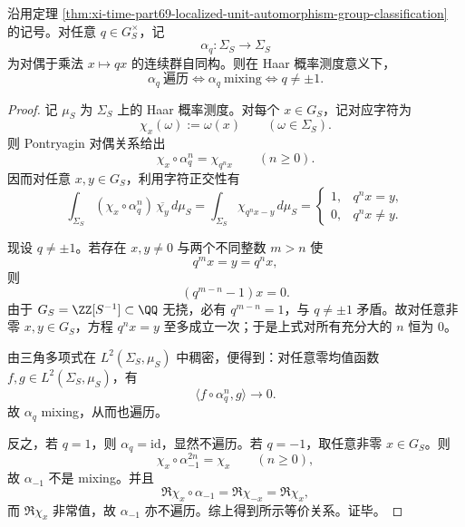 \begin{theorem}[rank-\texorpdfstring{$1$}{1} 局部化世界中遍历与 mixing 完全塌缩为 \texorpdfstring{$q\neq\pm1$}{q!=±1}]\label{thm:xi-time-part69-unit-automorphism-ergodic-mixing-collapse}
沿用定理 \ref{thm:xi-time-part69-localized-unit-automorphism-group-classification} 的记号。对任意 \(q\in G_S^\times\)，记
\[
\alpha_q:\Sigma_S\to\Sigma_S
\]
为对偶于乘法 \(x\mapsto qx\) 的连续群自同构。则在 Haar 概率测度意义下，
\[
\boxed{
\alpha_q\ \text{遍历}
\iff
\alpha_q\ \text{mixing}
\iff
q\neq \pm1.
}
\]
\end{theorem}
\begin{proof}
记 \(\mu_S\) 为 \(\Sigma_S\) 上的 Haar 概率测度。对每个 \(x\in G_S\)，记对应字符为
\[
\chi_x(\omega):=\omega(x)
\qquad(\omega\in \Sigma_S).
\]
则 Pontryagin 对偶关系给出
\[
\chi_x\circ \alpha_q^n=\chi_{q^n x}
\qquad(n\ge 0).
\]
因而对任意 \(x,y\in G_S\)，利用字符正交性有
\[
\int_{\Sigma_S}(\chi_x\circ \alpha_q^n)\,\overline{\chi_y}\,d\mu_S
=
\int_{\Sigma_S}\chi_{q^n x-y}\,d\mu_S
=
\begin{cases}
1,& q^n x=y,\\
0,& q^n x\neq y.
\end{cases}
\]

现设 \(q\neq \pm1\)。若存在 \(x,y\neq 0\) 与两个不同整数 \(m>n\) 使
\[
q^m x=y=q^n x,
\]
则
\[
(q^{m-n}-1)x=0.
\]
由于 \(G_S=\ZZ[S^{-1}]\subset\QQ\) 无挠，必有 \(q^{m-n}=1\)，与 \(q\neq \pm1\) 矛盾。故对任意非零 \(x,y\in G_S\)，方程 \(q^n x=y\) 至多成立一次；于是上式对所有充分大的 \(n\) 恒为 \(0\)。

由三角多项式在 \(L^2(\Sigma_S,\mu_S)\) 中稠密，便得到：对任意零均值函数 \(f,g\in L^2(\Sigma_S,\mu_S)\)，有
\[
\langle f\circ \alpha_q^n,g\rangle\longrightarrow 0.
\]
故 \(\alpha_q\) mixing，从而也遍历。

反之，若 \(q=1\)，则 \(\alpha_q=\mathrm{id}\)，显然不遍历。若 \(q=-1\)，取任意非零 \(x\in G_S\)。则
\[
\chi_x\circ \alpha_{-1}^{2n}=\chi_x
\qquad(n\ge 0),
\]
故 \(\alpha_{-1}\) 不是 mixing。并且
\[
\Re\chi_x\circ \alpha_{-1}
=
\Re\chi_{-x}
=
\Re\chi_x,
\]
而 \(\Re\chi_x\) 非常值，故 \(\alpha_{-1}\) 亦不遍历。综上得到所示等价关系。证毕。
\end{proof}

